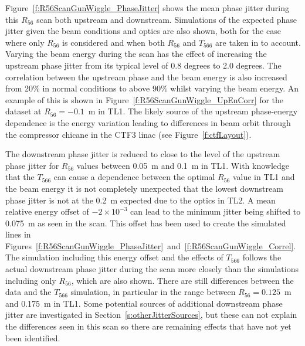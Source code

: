 Figure~\ref{f:R56ScanGunWiggle_PhaseJitter} shows the mean phase jitter during this \(R_{56}\) scan both upstream and downstream. Simulations of the expected phase jitter given the beam conditions and optics are also shown, both for the case where only \(R_{56}\) is considered and when both \(R_{56}\) and \(T_{566}\) are taken in to account. Varying the beam energy during the scan has the effect of increasing the upstream phase jitter from its typical level of 0.8 degrees to 2.0 degrees. The correlation between the upstream phase and the beam energy is also increased from 20\% in normal conditions to above 90\% whilst varying the beam energy. An example of this is shown in Figure~\ref{f:R56ScanGunWiggle_UpEnCorr} for the dataset at \(R_{56}=-0.1\)~m in TL1. The likely source of the upstream phase-energy dependence is the energy variation leading to differences in beam orbit through the compressor chicane in the CTF3 linac (see Figure~\ref{f:ctfLayout}).

The downstream phase jitter is reduced to close to the level of the upstream phase jitter for \(R_{56}\) values between 0.05~m and 0.1~m in TL1.  With knowledge that the \(T_{566}\) can cause a dependence between the optimal \(R_{56}\) value in TL1 and the beam energy it is not completely unexpected that the lowest downstream phase jitter is not at the 0.2~m expected due to the optics in TL2. A mean relative energy offset of \(-2\times10^{-3}\) can lead to the minimum jitter being shifted to 0.075~m as seen in the scan. This offset has been used to create the simulated lines  in Figures~\ref{f:R56ScanGunWiggle_PhaseJitter}~and~\ref{f:R56ScanGunWiggle_Correl}. The simulation including this energy offset and the effects of \(T_{566}\) follows the actual downstream phase jitter during the scan more closely than the simulations including only \(R_{56}\), which are also shown. There are still differences between the data and the \(T_{566}\) simulation, in particular in the range between \(R_{56} = 0.125\)~m and 0.175~m in TL1. Some potential sources of additional downstream phase jitter are investigated in Section~\ref{s:otherJitterSources}, but these can not explain the differences seen in this scan so there are remaining effects that have not yet been identified.

